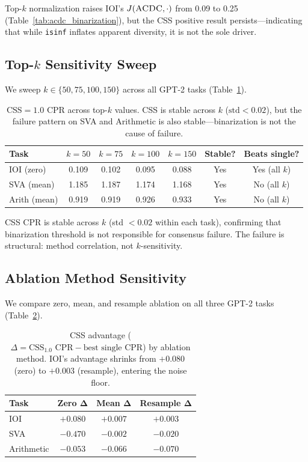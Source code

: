 \documentclass[11pt,a4paper]{article}
\newcommand{\css}{\textsc{CSS}}
\newcommand{\acdc}{\textsc{ACDC}}
\begin{document}
Top-$k$ normalization raises IOI's $J(\text{\acdc{}}, \cdot)$ from 0.09 to 0.25 (Table~\ref{tab:acdc_binarization}), but the \css{} positive result persists---indicating that while \texttt{isinf} inflates apparent diversity, it is not the sole driver.

\subsection{Top-$k$ Sensitivity Sweep}

We sweep $k \in \{50, 75, 100, 150\}$ across all GPT-2 tasks (Table~\ref{tab:topk_sweep}).

\begin{table}[t]
\centering
\small
\begin{tabular}{lcccccc}
\toprule
\textbf{Task} & $k{=}50$ & $k{=}75$ & $k{=}100$ & $k{=}150$ & \textbf{Stable?} & \textbf{Beats single?} \\
\midrule
IOI (zero)     & 0.109 & 0.102 & 0.095 & 0.088 & Yes & Yes (all $k$) \\
SVA (mean)     & 1.185 & 1.187 & 1.174 & 1.168 & Yes & No (all $k$) \\
Arith (mean) & 0.919 & 0.919 & 0.926 & 0.933 & Yes & No (all $k$) \\
\bottomrule
\end{tabular}
\caption{\css{}$= 1.0$ CPR across top-$k$ values. \css{} is stable across $k$ ($\text{std} < 0.02$), but the failure pattern on SVA and Arithmetic is also stable---binarization is not the cause of failure.}
\label{tab:topk_sweep}
\end{table}

\css{} CPR is stable across $k$ (std $< 0.02$ within each task), confirming that binarization threshold is not responsible for consensus failure. The failure is structural: method correlation, not $k$-sensitivity.

\subsection{Ablation Method Sensitivity}
\label{sec:ablation_confound}

We compare zero, mean, and resample ablation on all three GPT-2 tasks (Table~\ref{tab:ablation}).

\begin{table}[t]
\centering
\small
\begin{tabular}{lccc}
\toprule
\textbf{Task} & \textbf{Zero} $\boldsymbol{\Delta}$ & \textbf{Mean} $\boldsymbol{\Delta}$ & \textbf{Resample} $\boldsymbol{\Delta}$ \\
\midrule
IOI        & $+0.080$ & $+0.007$ & $+0.003$ \\
SVA        & $-0.470$ & $-0.002$ & $-0.020$ \\
Arithmetic & $-0.053$ & $-0.066$ & $-0.070$ \\
\bottomrule
\end{tabular}
\caption{\css{} advantage ($\Delta = \text{CSS}_{1.0}\text{ CPR} - \text{best single CPR}$) by ablation method. IOI's advantage shrinks from $+0.080$ (zero) to $+0.003$ (resample), entering the noise floor.}
\label{tab:ablation}
\end{table}
\end{document}

